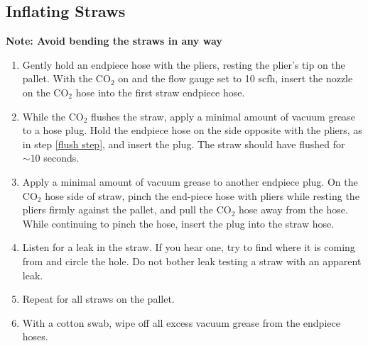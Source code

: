 \documentclass[A4,12pt]{article}
\begin{document}
\subsection{Inflating Straws} \label{performing test}
{\bf Note: Avoid bending the straws in any way}
	\begin{enumerate}
		\item Gently hold an endpiece hose with the pliers, resting the plier's tip on the pallet. With the CO$_2$ on and the flow gauge set to 10 scfh, insert the nozzle on the CO$_2$ hose into the first straw endpiece hose. \label{flush step}
		\item While the CO$_2$ flushes the straw, apply a minimal amount of vacuum grease to a hose plug. Hold the endpiece hose on the side opposite with the pliers, as in step \ref{flush step}, and insert the plug. The straw should have flushed for $\sim 10$ seconds.
		\item Apply a minimal amount of vacuum grease to another endpiece plug. On the CO$_2$ hose side of straw, pinch the end-piece hose with pliers while resting the pliers firmly against the pallet, and pull the CO$_2$ hose away from the hose. While continuing to pinch the hose, insert the plug into the straw hose.
		\item Listen for a leak in the straw. If you hear one, try to find where it is coming from and circle the hole. Do not bother leak testing a straw with an apparent leak.
		\item Repeat for all straws on the pallet.
		\item With a cotton swab, wipe off all excess vacuum grease from the endpiece hoses.


\end{enumerate}
\end{document}
